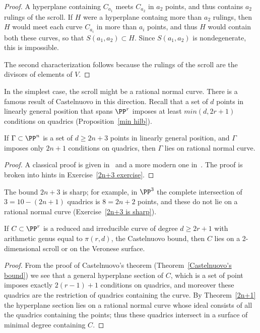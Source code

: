 \begin{proof}
A hyperplane containing $C_{a_1}$ meets $C_{a_2}$ in $a_2$
points, and thus contains $a_2$ rulings of the scroll. If $H$ were a hyperplane containg more than $a_2$
rulings, then $H$ would meet each curve $C_{a_i}$ in more than $a_i$ points, and thus $H$ would contain
both these curves, so that $S(a_1,a_2)\subset H$. Since $S(a_1,a_2)$ is nondegenerate, this is impossible.

The second characterization follows because the rulings of the scroll are the divisors of elements of $V.$
\end{proof}

In the simplest case, the scroll might be a rational normal curve. There is a famous result of Castelnuovo
in this direction. Recall that a set of $d$ points in linearly general position that spans $\PP^r$ imposes
at least $min(d, 2r+1)$ conditions on quadrics (Proposition~\ref{min hilb}).

\begin{theorem}\label{2n+3}
If $\Gamma\subset \PP^n$ is a set of $d\geq 2n+3$ points in linearly general position, and $\Gamma$ imposes only
$2n+1$ conditions on quadrics, then $\Gamma$ lies on rational normal curve.
\end{theorem}
\begin{proof}
 A  classical proof is given in~\cite[p.531]{Griffiths-Harris1978} and a more modern one in~\cite[Proposition 3.19]{MR685427}. 
 The proof is broken into hints in Exercise~\ref{2n+3 exercise}.
\end{proof}

The bound $2n+3$ is sharp; for example, in $\PP^3$ the complete intersection of $3 = 10 -(2n+1)$ quadrics
is $8=2n+2$ points, and these do not lie on a rational normal curve (Exercise~\ref{2n+3 is sharp}).


\begin{theorem}\label{Castelnuovo examples}
If $C\subset \PP^r$ is a reduced and irreducible curve of degree $d\geq 2r+1$ with arithmetic genus equal to $\pi(r,d)$, the
Castelnuovo bound, then $C$ lies on a 2-dimensional scroll or on  the Veronese surface.
\end{theorem}

\begin{proof}
From the proof of Castelnuovo's theorem (Theorem~\ref{Castelnuovo's bound}) we see that a general hyperplane
section of $C$, which is a set of point imposes exactly $2(r-1)+1$ conditions on quadrics, and moreover these
quadrics are the restriction of quadrics containing the curve. By Theorem~\ref{2n+1} the hyperplane
section lies on a rational normal curve whose ideal consists of all the quadrics containing the points;
thus these quadrics intersect in a surface of minimal degree containing $C$.
\end{proof}

